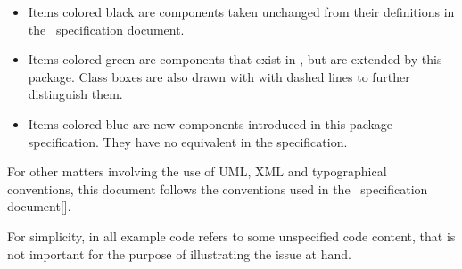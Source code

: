 \begin{itemize}
 \item {\color{black}} Items colored black are components taken unchanged 
      from their definitions in the \SbmlLevelThreeCore\ specification document.
 \item {\color{mediumgreen}} Items colored green are components that exist in 
      \SbmlLevelThreeCore, but are extended by this package. Class boxes are also drawn with with 
      dashed lines to further distinguish them.
 \item {\color{sbmlblue}} Items colored blue are new components introduced in this 
      package specification. They have no equivalent in  the \SbmlLevelThreeCore specification. 
\end{itemize}
 
For other matters involving the use of UML, XML and typographical conventions, this document follows the conventions
used in the \SbmlLevelThreeCore\ specification document[\cite{ref:sbmll3v1}].

For simplicity,  in all example code refers to some unspecified code content, that is not important for the purpose of illustrating the issue at hand.
